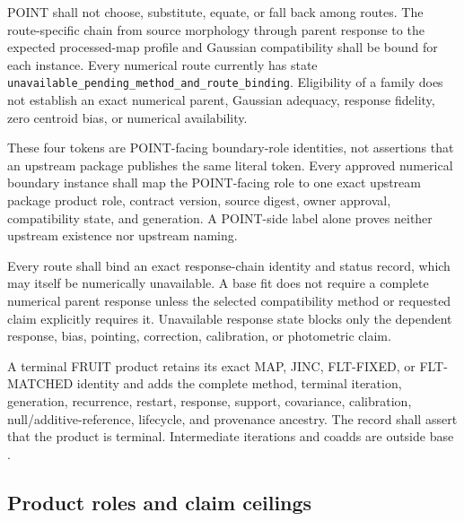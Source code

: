 POINT shall not choose, substitute, equate, or fall back among routes. The
route-specific chain from source morphology through parent response to the
expected processed-map profile and Gaussian compatibility shall be bound for
each instance. Every numerical route currently has state
\texttt{unavailable\_pending\_method\_and\_route\_binding}. Eligibility of a
family does not establish an exact numerical parent, Gaussian adequacy,
response fidelity, zero centroid bias, or numerical availability.

These four tokens are POINT-facing boundary-role identities, not assertions
that an upstream package publishes the same literal token. Every approved
numerical boundary instance shall map the POINT-facing role to one exact
upstream package product role, contract version, source digest, owner
approval, compatibility state, and generation. A POINT-side label alone
proves neither upstream existence nor upstream naming.

Every route shall bind an exact response-chain identity and status record,
which may itself be numerically unavailable. A base fit does not require a
complete numerical parent response unless the selected compatibility method
or requested claim explicitly requires it. Unavailable response state blocks
only the dependent response, bias, pointing, correction, calibration, or
photometric claim.

A terminal FRUIT product retains its exact MAP, JINC, FLT-FIXED, or
FLT-MATCHED identity and adds the complete method, terminal iteration,
generation, recurrence, restart, response, support, covariance, calibration,
null/additive-reference, lifecycle, and provenance ancestry. The record shall
assert that the product is terminal. Intermediate iterations and coadds are
outside base \ContractVersion.

\subsection{Product roles and claim ceilings}\label{sec:products}

